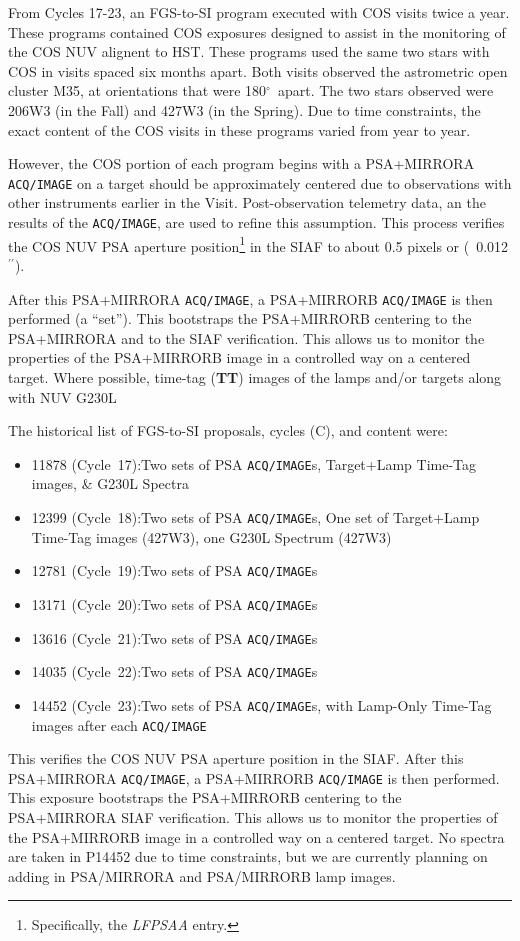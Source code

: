 \documentclass{stsci_report}
\def\arcsec{\hbox{$^{\prime\prime}$}}
\def\degree{\hbox{$^{\circ}$}}
\newcommand{\tacq}[1]{\texttt{ACQ/#1}}
\begin{document}
From Cycles 17-23, an FGS-to-SI program executed with COS visits twice a year. These programs contained COS exposures designed to assist in the monitoring of the COS NUV alignent to HST.
These programs used the same two stars with COS in visits spaced six months apart. Both visits observed the astrometric open cluster M35, at orientations that were 180\degree~apart.
The two stars observed were 206W3 (in the Fall) and 427W3 (in the Spring). Due to time constraints, the exact content of the COS visits in these programs varied from year to year.

However, the COS portion of each program begins with a PSA+MIRRORA \tacq{IMAGE} on a target should be approximately centered due to observations with other instruments earlier in the Visit.
Post-observation telemetry data, an the results of the \tacq{IMAGE}, are used to refine this assumption.
This process verifies the COS NUV PSA aperture position\footnote{Specifically, the \textit{LFPSAA} entry.} in the SIAF to about 0.5 pixels or (~0.012\arcsec).

After this PSA+MIRRORA \tacq{IMAGE}, a PSA+MIRRORB \tacq{IMAGE} is then performed (a ``set'').
This bootstraps the PSA+MIRRORB centering to the PSA+MIRRORA and to the SIAF verification.
This allows us to monitor the properties of the PSA+MIRRORB image in a controlled way on a centered target.
Where possible, time-tag (\textbf{TT}) images of the lamps and/or targets along with NUV G230L

The historical list of FGS-to-SI proposals, cycles (C), and content were:
\begin{itemize}
	\item{11878 (Cycle~17):}{Two sets of PSA \tacq{IMAGE}s, Target+Lamp Time-Tag images, \& G230L Spectra}
	\item{12399 (Cycle~18):}{Two sets of PSA \tacq{IMAGE}s, One set of Target+Lamp Time-Tag images (427W3), one G230L Spectrum (427W3)}
	\item{12781 (Cycle~19):}{Two sets of PSA \tacq{IMAGE}s}
	\item{13171 (Cycle~20):}{Two sets of PSA \tacq{IMAGE}s}
	\item{13616 (Cycle~21):}{Two sets of PSA \tacq{IMAGE}s}
	\item{14035 (Cycle~22):}{Two sets of PSA \tacq{IMAGE}s}
	\item{14452 (Cycle~23):}{Two sets of PSA \tacq{IMAGE}s,  with Lamp-Only Time-Tag images after each \tacq{IMAGE}}
\end{itemize}

This verifies the COS NUV PSA aperture position in the SIAF. After this PSA+MIRRORA \tacq{IMAGE}, a PSA+MIRRORB \tacq{IMAGE} is then performed.
This exposure bootstraps the PSA+MIRRORB centering to the PSA+MIRRORA SIAF verification.
This allows us to monitor the properties of the PSA+MIRRORB image in a controlled way on a centered target.
No spectra are taken in P14452 due to time constraints, but we are currently planning on adding in PSA/MIRRORA and PSA/MIRRORB lamp images.
\end{document}
